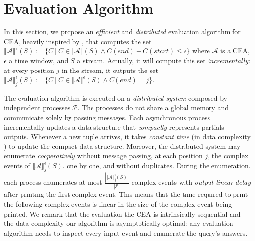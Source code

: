 \chapter{Evaluation Algorithm}\label{chapter:algorithm}

In this section, we propose an \emph{efficient} and \emph{distributed} evaluation algorithm for CEA, heavily inspired by \cite{core}, that computes the set ${\llbracket \mathcal{A} \rrbracket}^{\epsilon}(S) := \{ C \ | \ C \in {\llbracket \mathcal{A} \rrbracket}(S) \land C(end) - C(start) \le \epsilon\}$ where $\mathcal{A}$ is a CEA, $\epsilon$ a time window, and $S$ a stream. Actually, it will compute this set \emph{incrementally}: at every position $j$ in the stream, it outputs the set ${\llbracket \mathcal{A} \rrbracket}^{\epsilon}_{j}(S) := \{ C \ | \ C \in {\llbracket \mathcal{A} \rrbracket}^{\epsilon}(S) \land C(end) = j \}$.

The evaluation algorithm is executed on a \emph{distributed system} composed by independent processes $\mathcal{P}$. The processes do not share a global memory and communicate solely by passing messages. Each asynchronous process incrementally updates a data structure that \emph{compactly} represents partials outputs. Whenever a new tuple arrives, it takes \emph{constant time} (in data complexity \cite{data-complexity}) to update the compact data structure. Moreover, the distributed system may enumerate \emph{cooperatively} without message passing, at each position $j$, the complex events of ${\llbracket \mathcal{A} \rrbracket}^{\epsilon}_{j}(S)$, one by one, and without duplicates. During the enumeration, each process enumerates at most $\frac{|{\llbracket \mathcal{A} \rrbracket}^{\epsilon}_{j}(S)|}{|\mathcal{P}|}$ complex events with \emph{output-linear delay} after printing the first complex event. This means that the time required to print the following complex events is linear in the size of the complex event being printed. We remark that the evaluation the CEA is intrinsically sequential and the data complexity our algorithm is asymptotically optimal: any evaluation algorithm needs to inspect every input event and enumerate the query's answers.

